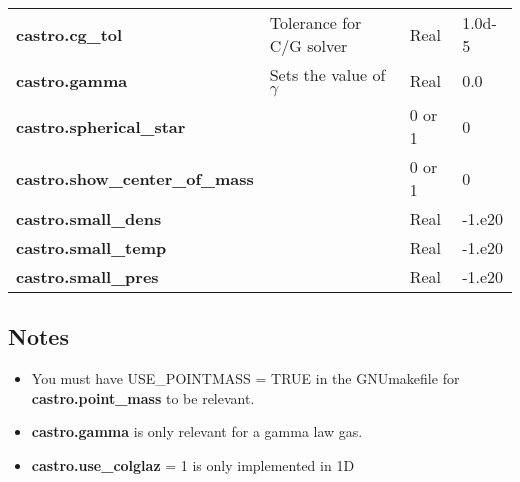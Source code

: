 \begin{table*}[h]
\begin{scriptsize}
\begin{center}
\begin{tabular}{|l|p{3.0in}|l|l|}
{\bf castro.cg\_tol} & Tolerance for C/G solver & Real & 1.0d-5 \\
{\bf castro.gamma} & Sets the value of $\gamma$ & Real & 0.0 \\
{\bf castro.spherical\_star} & & 0 or 1 & 0 \\
{\bf castro.show\_center\_of\_mass} & & 0 or 1 & 0 \\
{\bf castro.small\_dens} & & Real & -1.e20 \\
{\bf castro.small\_temp} & & Real & -1.e20 \\
{\bf castro.small\_pres} & & Real & -1.e20 \\
\hline
\end{tabular}
\label{Table:Physics}
\end{center}
\end{scriptsize}
\end{table*}

\subsection{Notes}

\begin{itemize}
\item You must have USE\_POINTMASS  = TRUE in the GNUmakefile for {\bf castro.point\_mass} to be relevant.
\item {\bf castro.gamma} is only relevant for a gamma law gas.
\item {\bf castro.use\_colglaz}  = 1 is only implemented in 1D
\end{itemize}


